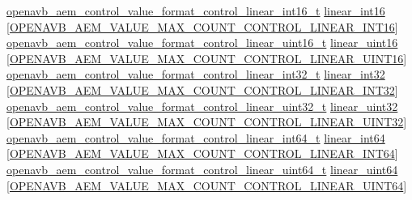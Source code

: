 \begin{DoxyCompactItemize}
\begin{tabbing}
\>\hyperlink{structopenavb__aem__control__value__format__control__linear__int16__t}{openavb\_aem\_control\_value\_format\_control\_linear\_int16\_t} \hyperlink{structopenavb__aem__descriptor__control__t_a5d3d5bcd67c7647a95844febd584233f}{linear\_int16} \mbox{[}\hyperlink{openavb__aem__types__pub_8h_ae368778860931dd6fbe81c0ad8c8286d}{OPENAVB\_AEM\_VALUE\_MAX\_COUNT\_CONTROL\_LINEAR\_INT16}\mbox{]}\\
\>\hyperlink{structopenavb__aem__control__value__format__control__linear__uint16__t}{openavb\_aem\_control\_value\_format\_control\_linear\_uint16\_t} \hyperlink{structopenavb__aem__descriptor__control__t_ad1277b2c74498d99af53429244dca488}{linear\_uint16} \mbox{[}\hyperlink{openavb__aem__types__pub_8h_a9f425d29d7532d609c77c5efcb2bbd14}{OPENAVB\_AEM\_VALUE\_MAX\_COUNT\_CONTROL\_LINEAR\_UINT16}\mbox{]}\\
\>\hyperlink{structopenavb__aem__control__value__format__control__linear__int32__t}{openavb\_aem\_control\_value\_format\_control\_linear\_int32\_t} \hyperlink{structopenavb__aem__descriptor__control__t_a57bf21a896ba46aae742255afe5e14c0}{linear\_int32} \mbox{[}\hyperlink{openavb__aem__types__pub_8h_a985968a860b9e18c493e864357ee476a}{OPENAVB\_AEM\_VALUE\_MAX\_COUNT\_CONTROL\_LINEAR\_INT32}\mbox{]}\\
\>\hyperlink{structopenavb__aem__control__value__format__control__linear__uint32__t}{openavb\_aem\_control\_value\_format\_control\_linear\_uint32\_t} \hyperlink{structopenavb__aem__descriptor__control__t_a901b6fa52ddeeb24b5ac748d9e4103b9}{linear\_uint32} \mbox{[}\hyperlink{openavb__aem__types__pub_8h_a959df5b9317184e15dba0d2c1fd7382c}{OPENAVB\_AEM\_VALUE\_MAX\_COUNT\_CONTROL\_LINEAR\_UINT32}\mbox{]}\\
\>\hyperlink{structopenavb__aem__control__value__format__control__linear__int64__t}{openavb\_aem\_control\_value\_format\_control\_linear\_int64\_t} \hyperlink{structopenavb__aem__descriptor__control__t_a9977e94551874d9a40449ffc9162b73b}{linear\_int64} \mbox{[}\hyperlink{openavb__aem__types__pub_8h_ae00ad286a8aa4b0f37d5e4f1a07e83b2}{OPENAVB\_AEM\_VALUE\_MAX\_COUNT\_CONTROL\_LINEAR\_INT64}\mbox{]}\\
\>\hyperlink{structopenavb__aem__control__value__format__control__linear__uint64__t}{openavb\_aem\_control\_value\_format\_control\_linear\_uint64\_t} \hyperlink{structopenavb__aem__descriptor__control__t_a675320b41c5517b214ace016f046ce9a}{linear\_uint64} \mbox{[}\hyperlink{openavb__aem__types__pub_8h_a30cfe39a24c8072db5519b5945a352de}{OPENAVB\_AEM\_VALUE\_MAX\_COUNT\_CONTROL\_LINEAR\_UINT64}\mbox{]}\\

\end{tabbing}
\end{DoxyCompactItemize}
